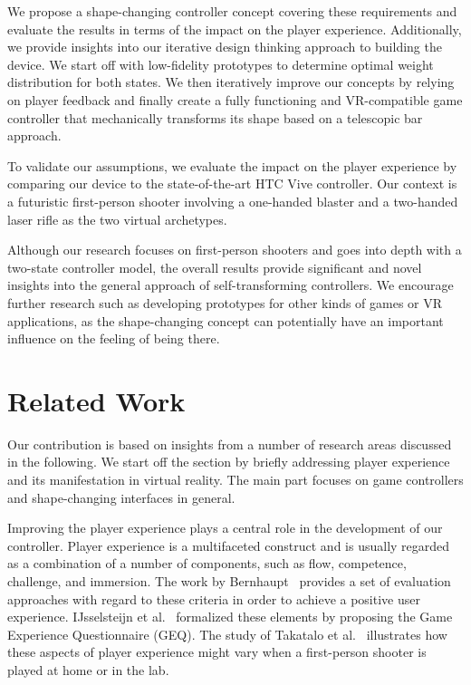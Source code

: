 \documentclass{sigchi}
\begin{document}
We propose a shape-changing controller concept covering these requirements and evaluate the results in terms of the impact on the player experience. Additionally, we provide insights into our iterative design thinking approach to building the device. We start off with low-fidelity prototypes to determine optimal weight distribution for both states. We then iteratively improve our concepts by relying on player feedback and finally create a fully functioning and VR-compatible game controller that mechanically transforms its shape based on a telescopic bar approach. 

To validate our assumptions, we evaluate the impact on the player experience by comparing our device to the state-of-the-art HTC Vive controller. Our context is a futuristic first-person shooter involving a one-handed blaster and a two-handed laser rifle as the two virtual archetypes.

Although our research focuses on first-person shooters and goes into depth with a two-state controller model, the overall results provide significant and novel insights into the general approach of self-transforming controllers. We encourage further research such as developing prototypes for other kinds of games or VR applications, as the shape-changing concept can potentially have an important influence on the feeling of being there.


\section{Related Work}

Our contribution is based on insights from a number of research areas discussed in the following. We start off the section by briefly addressing player experience  and its manifestation in virtual reality. The main part focuses on game controllers and shape-changing interfaces in general.

Improving the player experience plays a central role in the development of our controller. Player experience is a multifaceted construct and is usually regarded as a combination of a number of components, such as flow, competence, challenge, and immersion. The work by Bernhaupt~\cite{Bernhaupt2010} provides a set of evaluation approaches with regard to these criteria in order to achieve a positive user experience. IJsselsteijn et al.~\cite{ijsselsteijn2007characterising, ijsselsteijn2008measuring} formalized these elements by proposing the Game Experience Questionnaire (GEQ). The study of Takatalo et al.~\cite{Takatalo} illustrates how these aspects of player experience might vary when a first-person shooter is played at home or in the lab.
\end{document}
